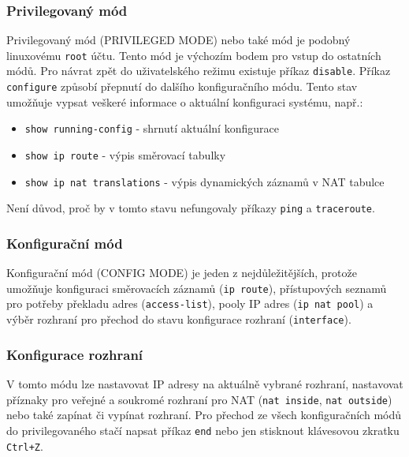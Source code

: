 \subsubsection{Privilegovaný mód}
Privilegovaný mód (PRIVILEGED MODE) nebo také  mód je podobný linuxovému \verb|root| účtu. Tento mód je výchozím bodem pro vstup do ostatních módů. Pro návrat zpět do uživatelského režimu existuje příkaz \verb|disable|. Příkaz \verb|configure| způsobí přepnutí do dalšího konfiguračního módu. Tento stav umožňuje vypsat veškeré informace o aktuální konfiguraci systému, např.:
\begin{itemize}
 \item \verb|show running-config| - shrnutí aktuální konfigurace
 \item \verb|show ip route| - výpis směrovací tabulky
 \item \verb|show ip nat translations| - výpis dynamických záznamů v NAT tabulce
\end{itemize}
Není důvod, proč by v tomto stavu nefungovaly příkazy \verb|ping| a \verb|traceroute|.

\subsubsection{Konfigurační mód}
Konfigurační mód (CONFIG MODE) je jeden z nejdůležitějších, protože umožňuje konfiguraci směrovacích záznamů (\verb|ip route|), přístupových seznamů pro potřeby překladu adres (\verb|access-list|), pooly IP adres (\verb|ip nat pool|) a výběr rozhraní pro přechod do stavu konfigurace rozhraní (\verb|interface|).

\subsubsection{Konfigurace rozhraní} \label{configif}
V tomto módu lze nastavovat IP adresy na aktuálně vybrané rozhraní, nastavovat příznaky pro veřejné a soukromé rozhraní pro NAT (\verb|nat inside|, \verb|nat outside|) nebo také zapínat či vypínat rozhraní. Pro přechod ze všech konfiguračních módů do privilegovaného stačí napsat příkaz \verb|end| nebo jen stisknout klávesovou zkratku \verb|Ctrl+Z|.



